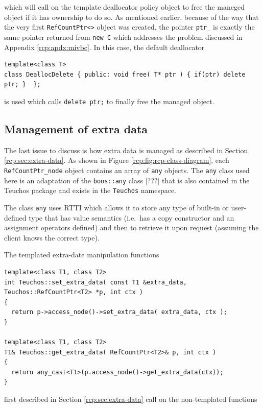 {}\noindent{}which will call on the template deallocator policy object
to free the maneged object if it has ownership to do so.  As
mentioned earlier, because of the way that the very first
{}\texttt{RefCountPtr<>} object was created, the pointer
{}\texttt{ptr\_} is exactly the same pointer returned from
{}\texttt{new C} which addresses the problem discussed in Appendix
{}\ref{rcp:apdx:mivbc}.  In this case, the default deallocator

{\scriptsize\begin{verbatim}
template<class T>
class DeallocDelete { public: void free( T* ptr ) { if(ptr) delete ptr; }  };
\end{verbatim}}

{}\noindent{}is used which calls {}\texttt{delete ptr;} to finally
free the managed object.

%
\subsection{Management of extra data}
%

The last issue to discuss is how extra data is managed as described in
Section {}\ref{rcp:sec:extra-data}.  As shown in Figure
{}\ref{rcp:fig:rcp-class-diagram}, each
{}\texttt{Ref\-Count\-Ptr\-\_node} object contains an array of
{}\texttt{any} objects.  The {}\texttt{any} class used here is an
adaptation of the {}\texttt{boos\-::any} class [???] that is also
contained in the Teuchos package and exists in the {}\texttt{Teuchos}
namespace.

The class {}\texttt{any} uses RTTI which allows it to store any type
of built-in or user-defined type that has value semantics (i.e.~has a
copy constructor and an assignment operators defined) and then to
retrieve it upon request (assuming the client knows the correct type).

The templated extra-date manipulation functions

{\scriptsize\begin{verbatim}
template<class T1, class T2>
int Teuchos::set_extra_data( const T1 &extra_data, Teuchos::RefCountPtr<T2> *p, int ctx )
{
  return p->access_node()->set_extra_data( extra_data, ctx );
}

template<class T1, class T2>
T1& Teuchos::get_extra_data( RefCountPtr<T2>& p, int ctx )
{
  return any_cast<T1>(p.access_node()->get_extra_data(ctx));
}
\end{verbatim}}

{}\noindent{}first described in Section {}\ref{rcp:sec:extra-data}
call on the non-templated functions


